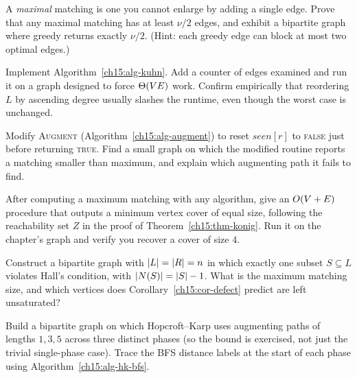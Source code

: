 \begin{exercise}
\label{ch15:ex-greedy}
A \emph{maximal} matching is one you cannot enlarge by adding a single edge.
Prove that any maximal matching has at least $\nu/2$ edges, and exhibit a
bipartite graph where greedy returns exactly $\nu/2$. (Hint: each greedy edge can
block at most two optimal edges.)
\end{exercise}

\begin{exercise}
\label{ch15:ex-kuhn}
Implement Algorithm~\ref{ch15:alg-kuhn}. Add a counter of edges examined and run
it on a graph designed to force $\Theta(VE)$ work. Confirm empirically that
reordering $L$ by ascending degree usually slashes the runtime, even though the
worst case is unchanged.
\end{exercise}

\begin{exercise}
\label{ch15:ex-seen}
Modify \textsc{Augment} (Algorithm~\ref{ch15:alg-augment}) to reset
$\mathit{seen}[r]$ to \textsc{false} just before returning \textsc{true}. Find a
small graph on which the modified routine reports a matching smaller than
maximum, and explain which augmenting path it fails to find.
\end{exercise}

\begin{exercise}
\label{ch15:ex-konig}
After computing a maximum matching with any algorithm, give an $O(V+E)$
procedure that outputs a minimum vertex cover of equal size, following the
reachability set $Z$ in the proof of Theorem~\ref{ch15:thm-konig}. Run it on the
chapter's graph and verify you recover a cover of size $4$.
\end{exercise}

\begin{exercise}
\label{ch15:ex-hall}
Construct a bipartite graph with $\lvert L\rvert=\lvert R\rvert=n$ in which exactly one subset
$S\subseteq L$ violates Hall's condition, with $\lvert N(S)\rvert=\lvert S\rvert-1$. What is the
maximum matching size, and which vertices does Corollary~\ref{ch15:cor-defect}
predict are left unsaturated?
\end{exercise}

\begin{exercise}
\label{ch15:ex-hk-lengths}
Build a bipartite graph on which Hopcroft--Karp uses augmenting paths of lengths
$1,3,5$ across three distinct phases (so the bound is exercised, not just the
trivial single-phase case). Trace the BFS distance labels at the start of each
phase using Algorithm~\ref{ch15:alg-hk-bfs}.
\end{exercise}

